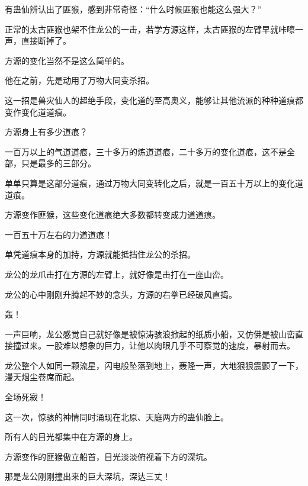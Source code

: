 \begin{this_body}
有蛊仙辨认出了匪猴，感到非常奇怪：“什么时候匪猴也能这么强大？”

正常的太古匪猴也架不住龙公的一击，若学方源这样，太古匪猴的左臂早就咔嚓一声，直接断掉了。

方源的变化当然不是这么简单的。

他在之前，先是动用了万物大同变杀招。

这一招是兽灾仙人的超绝手段，变化道的至高奥义，能够让其他流派的种种道痕都变作变化道道痕。

方源身上有多少道痕？

一百万以上的气道道痕，三十多万的炼道道痕，二十多万的变化道痕，这不是全部，只是最多的三部分。

单单只算是这部分道痕，通过万物大同变转化之后，就是一百五十万以上的变化道道痕。

方源变作匪猴，这些变化道痕绝大多数都转变成力道道痕。

一百五十万左右的力道道痕！

单凭道痕本身的加持，方源就能抵挡住龙公的杀招。

龙公的龙爪击打在方源的左臂上，就好像是击打在一座山峦。

龙公的心中刚刚升腾起不妙的念头，方源的右拳已经破风直捣。

轰！

一声巨响，龙公感觉自己就好像是被惊涛骇浪掀起的纸质小船，又仿佛是被山峦直接撞过来。一股难以想象的巨力，让他以肉眼几乎不可察觉的速度，暴射而去。

龙公整个人如同一颗流星，闪电般坠落到地上，轰隆一声，大地狠狠震颤了一下，漫天烟尘卷席而起。

全场死寂！

这一次，惊骇的神情同时涌现在北原、天庭两方的蛊仙脸上。

所有人的目光都集中在方源的身上。

方源变作的匪猴傲立船首，目光淡淡俯视着下方的深坑。

那是龙公刚刚撞出来的巨大深坑，深达三丈！

\end{this_body}

